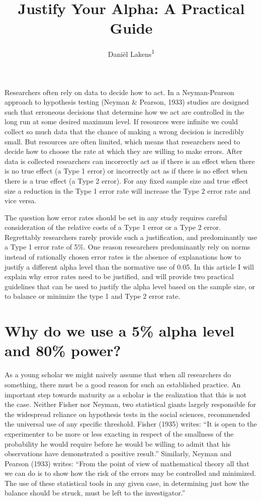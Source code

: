 \documentclass[,jou,floatsintext]{apa6}
\title{Justify Your Alpha: A Practical Guide}
\author{Daniël Lakens\textsuperscript{1}}
\date{}
\affiliation{
\vspace{0.5cm}
\textsuperscript{1} Eindhoven University of Technology, The Netherlands}
\begin{document}
\maketitle

Researchers often rely on data to decide how to act. In a Neyman-Pearson approach to hypothesis testing (Neyman \& Pearson, 1933) studies are designed such that erroneous decisions that determine how we act are controlled in the long run at some desired maximum level. If resources were infinite we could collect so much data that the chance of making a wrong decision is incredibly small. But resources are often limited, which means that researchers need to decide how to choose the rate at which they are willing to make errors. After data is collected researchers can incorrectly act as if there is an effect when there is no true effect (a Type 1 error) or incorrectly act as if there is no effect when there is a true effect (a Type 2 error). For any fixed sample size and true effect size a reduction in the Type 1 error rate will increase the Type 2 error rate and vice versa.

The question how error rates should be set in any study requires careful consideration of the relative costs of a Type 1 error or a Type 2 error. Regrettably researchers rarely provide such a justification, and predominantly use a Type 1 error rate of 5\%. One reason researchers predominantly rely on norms instead of rationally chosen error rates is the absence of explanations how to justify a different alpha level than the normative use of 0.05. In this article I will explain why error rates need to be justified, and will provide two practical guidelines that can be used to justify the alpha level based on the sample size, or to balance or minimize the type 1 and Type 2 error rate.

\hypertarget{why-do-we-use-a-5-alpha-level-and-80-power}{%
\section{Why do we use a 5\% alpha level and 80\% power?}\label{why-do-we-use-a-5-alpha-level-and-80-power}}

As a young scholar we might naively assume that when all researchers do something, there must be a good reason for such an established practice. An important step towards maturity as a scholar is the realization that this is not the case. Neither Fisher nor Neyman, two statistical giants largely responsible for the widespread reliance on hypothesis tests in the social sciences, recommended the universal use of any specific threshold. Fisher (1935) writes: \enquote{It is open to the experimenter to be more or less exacting in respect of the smallness of the probability he would require before he would be willing to admit that his observations have demonstrated a positive result.} Similarly, Neyman and Pearson (1933) writes: \enquote{From the point of view of mathematical theory all that we can do is to show how the risk of the errors may be controlled and minimized. The use of these statistical tools in any given case, in determining just how the balance should be struck, must be left to the investigator.}
\end{document}
